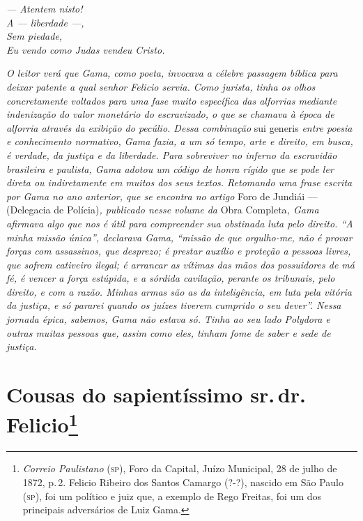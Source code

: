 \emph{--- Atentem nisto!\\
A --- liberdade ---,\\
Sem piedade,\\
Eu vendo como Judas vendeu Cristo.}

\emph{O leitor verá que Gama, como poeta, invocava a célebre passagem
bíblica para deixar patente a qual senhor Felicio servia. Como jurista,
tinha os olhos concretamente voltados para uma fase muito específica das
alforrias mediante indenização do valor monetário do escravizado, o que
se chamava à época de alforria através da exibição do pecúlio. Dessa
combinação} sui generis \emph{entre poesia e conhecimento normativo,
Gama fazia, a um só tempo, arte e direito, em busca, é verdade, da
justiça e da liberdade. Para sobreviver no inferno da escravidão
brasileira e paulista, Gama adotou um código de honra rígido que se pode
ler direta ou indiretamente em muitos dos seus textos. Retomando uma
frase escrita por Gama no ano anterior, que se encontra no artigo} Foro
de Jundiái --- (Delegacia de Polícia)\emph{, publicado nesse volume da}
Obra Completa\emph{, Gama afirmava algo que nos é útil para compreender
sua obstinada luta pelo direito. ``A minha missão única'', declarava Gama,
``missão de que orgulho-me, não é provar forças com assassinos, que
desprezo; é prestar auxílio e proteção a pessoas livres, que sofrem
cativeiro ilegal; é arrancar as vítimas das mãos dos possuidores de má
fé, é vencer a força estúpida, e a sórdida cavilação, perante os
tribunais, pelo direito, e com a razão. Minhas armas são as da
inteligência, em luta pela vitória da justiça, e só pararei quando os
juízes tiverem cumprido o seu dever''. Nessa jornada épica, sabemos, Gama
não estava só. Tinha ao seu lado Polydora e outras muitas pessoas que,
assim como eles, tinham fome de saber e sede de justiça.}

\chapter{Cousas do sapientíssimo sr.\,dr.\,Felicio\footnote{
\emph{Correio Paulistano} (\textsc{sp}), Foro da Capital, Juízo
  Municipal, 28 de julho de 1872, p.\,2. Felicio Ribeiro dos Santos Camargo (?-?),
  nascido em São Paulo (\textsc{sp}), foi um político e juiz que, a exemplo de
  Rego Freitas, foi um dos principais adversários de Luiz Gama.}} %

